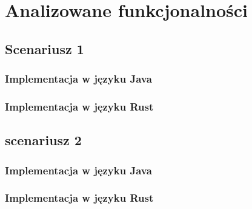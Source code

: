 \chapter{Analizowane funkcjonalności}
\label{chap:obiekt}


\section{Scenariusz 1}  %
\subsection{Implementacja w języku Java}
\subsection{Implementacja w języku Rust}


\section{scenariusz 2}
\subsection{Implementacja w języku Java}
\subsection{Implementacja w języku Rust}

